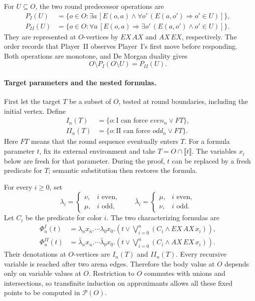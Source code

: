 For \(U\subseteq O\),
the two round predecessor
operations are
\[
\begin{aligned}
 P_I(U)&=\{o\in O:\exists a\,[E(o,a)\land
                   \forall o'\,(E(a,o')\Rightarrow o'\in U)]\},\\
 P_{II}(U)&=\{o\in O:\forall a\,[E(o,a)\Rightarrow
                   \exists o'\,(E(a,o')\land o'\in U)]\}.
\end{aligned}
\]
They are represented at
\(O\)-vertices by \(EX\,AX\)
and \(AX\,EX\), respectively.
The order records that
Player~II observes Player~I's
first move before responding.
Both operations are monotone,
and De Morgan duality gives
\[
 O\setminus P_I(O\setminus U)=P_{II}(U).
\]

\paragraph{Target parameters and the nested formulas.}
First let the target
\(T\) be a subset of
\(O\), tested at round
boundaries, including the
initial vertex. Define
\[
\begin{aligned}
 I_n(T)&=\{o:\text{I can force }even_n\lor F T\},\\
 II_n(T)&=\{o:\text{II can force }odd_n\lor F T\}.
\end{aligned}
\]
Here \(F T\) means
that the round sequence
eventually enters \(T\).
For a formula parameter
\(t\), fix its external
environment and take
\(T=O\cap\llbracket t\rrbracket\).
The variables \(x_i\)
below are fresh for
that parameter.
During the proof, \(t\)
can be replaced by a
fresh predicate for \(T\);
semantic substitution then
restores the formula.

For every \(i\geq0\), set
\[
 \lambda_i=
 \begin{cases}\nu,&i\text{ even},\\\mu,&i\text{ odd},\end{cases}
 \qquad
 \bar\lambda_i=
 \begin{cases}\mu,&i\text{ even},\\\nu,&i\text{ odd}.\end{cases}
\]
Let \(C_i\) be the
predicate for color \(i\).
The two characterizing
formulas are
\[
\begin{aligned}
 \Phi_n^I(t)
 &=\lambda_nx_n.\cdots\lambda_0x_0.
      \left(t\lor\bigvee_{i=0}^n(C_i\land EX\,AX\,x_i)\right),\\
 \Phi_n^{II}(t)
 &=\bar\lambda_nx_n.\cdots\bar\lambda_0x_0.
      \left(t\lor\bigvee_{i=0}^n(C_i\land AX\,EX\,x_i)\right).
\end{aligned}
\]
Their denotations at
\(O\)-vertices are
\(I_n(T)\) and \(II_n(T)\).
Every recursive variable
is reached after two
arena edges. Therefore
the body value at \(O\)
depends only on variable
values at \(O\).
Restriction to \(O\)
commutes with unions and
intersections, so transfinite
induction on approximants
allows all these fixed
points to be computed
in \(\mathcal P(O)\).

